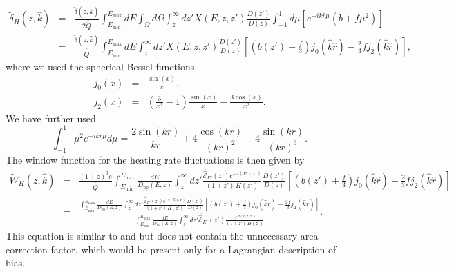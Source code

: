 \documentclass[numberedappendix]{emulateapj}
\begin{document}
\begin{eqnarray}
\tilde{\delta}_H(z,\hat k)&=&\frac{\tilde{\delta}(z,\hat k)}{2\bar{\dot{Q}}}\int_{E_{\mathrm{min}}}^{E_{\mathrm{max}}} dE \int_{\Omega}d\Omega\int_z^{\infty} dz'X(E,z,z')\frac{D(z')}{D(z)}\int_{-1}^{1}d\mu\left[e^{-i\hat k \hat r\mu} (b +f \mu^2)\right]\\ \nonumber
&=&\frac{\tilde{\delta}(z,\hat k)}{\bar{\dot{Q}}}\int_{E_{\mathrm{min}}}^{E_{\mathrm{max}}} dE\int_z^{\infty}dz'X(E,z,z')\frac{D(z')}{D(z)}\left[\left(b(z')+\frac{f}{3}\right)j_0(\hat k \hat r)-\frac{2}{3}f j_2(\hat k \hat r)\right],
\end{eqnarray}
where we used the spherical Bessel functions
\begin{eqnarray}
\label{eq:bessel}
j_0(x)&=& \frac{\sin(x)}{x},\\
j_2(x)&=& \left(\frac{3}{x^2}-1\right)\frac{\sin(x)}{x}-\frac{3 \cos(x)}{x^2} .
\end{eqnarray}
We have further used
\begin{equation}
\label{eq:bes2}
\int_{-1}^{1}\mu^2 e^{-i k r \mu} d\mu=\frac{2 \sin(kr)}{kr}+4\frac{\cos(kr)}{(kr)^2}-4\frac{\sin(kr)}{(kr)^3}.
\end{equation}
The window function for the heating rate fluctuations is then given by
\begin{eqnarray}
\label{eq:heat_fluc}
\tilde{W}_H(z,\hat k)&=&\frac{(1+z)^3c }{\bar{\dot{Q}}}\int_{E_{\mathrm{min}}}^{E_{\mathrm{max}}} \frac{dE}{D_{\mathrm{pp}}(E,z)}\int_z^{\infty} dz' \frac{\mathcal{\bar{\hat E}}_{E'}(z')e^{-\tau(E,z,z')}}{(1+z')\,H(z')}\frac{D(z')}{D(z)}\left[\left(b(z')+\frac{f}{3}\right)j_0(\hat k \hat r)-\frac{2}{3}f j_2(\hat k \hat r)\right]\\
&=& \frac{\displaystyle \int_{E_{\mathrm{min}}}^{E_{\mathrm{max}}} \frac{dE}{{D_{\mathrm{pp}}}(E,z)}\int_z^{\infty} dz'   \frac{\mathcal{\bar{\hat E}}_{E'}(z')e^{-\tau(E,z,z')}}{(1+z')\,H(z')}\frac{D(z')}{D(z)}\left[\left(b(z')+\frac{f}{3}\right)j_0(\hat k \hat r)-\frac{2f}{3}j_2(\hat k \hat r)\right]}{\displaystyle \int_{E_{\mathrm{min}}}^{E_{\mathrm{max}}} \frac{dE}{{D_{\mathrm{pp}}}(E,z)}\int_z^{\infty} dz'  \mathcal{\bar{\hat E}}_{E'}(z') \frac{e^{-\tau(E,z,z')}}{(1+z')\,H(z')}}.
\end{eqnarray}
This equation is similar to \citet{2007MNRAS.376.1680P} and \citet{2005ApJ...626....1B} but does not contain the unnecessary area correction factor, which would be present only for a Lagrangian description of bias.


\end{document}
